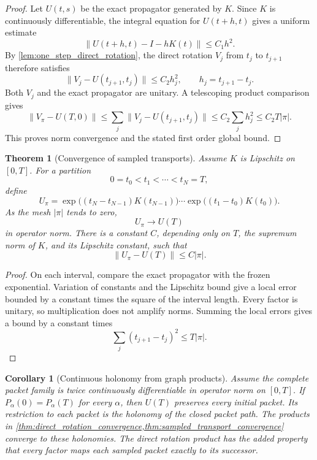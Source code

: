 \documentclass[11pt,a4paper]{article}
\newtheorem{theorem}{Theorem}[section]
\theoremstyle{plain}
\newtheorem{corollary}[corollary]{Corollary}
\theoremstyle{definition}
\theoremstyle{remark}
\begin{document}
\begin{proof}
Let $U(t,s)$ be the exact propagator generated by $K$.  Since $K$ is continuously differentiable, the integral equation for $U(t+h,t)$ gives a uniform estimate
\[
\|U(t+h,t)-I-hK(t)\|
\le
C_1h^2.
\]
By \cref{lem:one_step_direct_rotation}, the direct rotation $V_j$ from $t_j$ to $t_{j+1}$ therefore satisfies
\[
\|V_j-U(t_{j+1},t_j)\|
\le
C_2h_j^2,
\qquad
h_j=t_{j+1}-t_j.
\]
Both $V_j$ and the exact propagator are unitary.  A telescoping product comparison gives
\[
\|V_\pi-U(T,0)\|
\le
\sum_j\|V_j-U(t_{j+1},t_j)\|
\le
C_2\sum_jh_j^2
\le
C_2T|\pi|.
\]
This proves norm convergence and the stated first order global bound.
\end{proof}

\begin{theorem}[Convergence of sampled transports]\label{thm:sampled_transport_convergence}
Assume $K$ is Lipschitz on $[0,T]$.  For a partition
\[
0=t_0<t_1<\cdots<t_N=T,
\]
define
\[
U_\pi
=
\exp\big((t_N-t_{N-1})K(t_{N-1})\big)
\cdots
\exp\big((t_1-t_0)K(t_0)\big).
\]
As the mesh $|\pi|$ tends to zero,
\[
U_\pi\longrightarrow U(T)
\]
in operator norm.  There is a constant $C$, depending only on $T$, the supremum norm of $K$, and its Lipschitz constant, such that
\[
\|U_\pi-U(T)\|
\le C|\pi|.
\]
\end{theorem}

\begin{proof}
On each interval, compare the exact propagator with the frozen exponential.  Variation of constants and the Lipschitz bound give a local error bounded by a constant times the square of the interval length.  Every factor is unitary, so multiplication does not amplify norms.  Summing the local errors gives a bound by a constant times
\[
\sum_j(t_{j+1}-t_j)^2
\le
T|\pi|.
\]
\end{proof}

\begin{corollary}[Continuous holonomy from graph products]\label{cor:continuous_holonomy}
Assume the complete packet family is twice continuously differentiable in operator norm on $[0,T]$. If $P_\alpha(0)=P_\alpha(T)$ for every $\alpha$, then $U(T)$ preserves every initial packet.  Its restriction to each packet is the holonomy of the closed packet path.  The products in \cref{thm:direct_rotation_convergence,thm:sampled_transport_convergence} converge to these holonomies.  The direct rotation product has the added property that every factor maps each sampled packet exactly to its successor.
\end{corollary}
\end{document}
